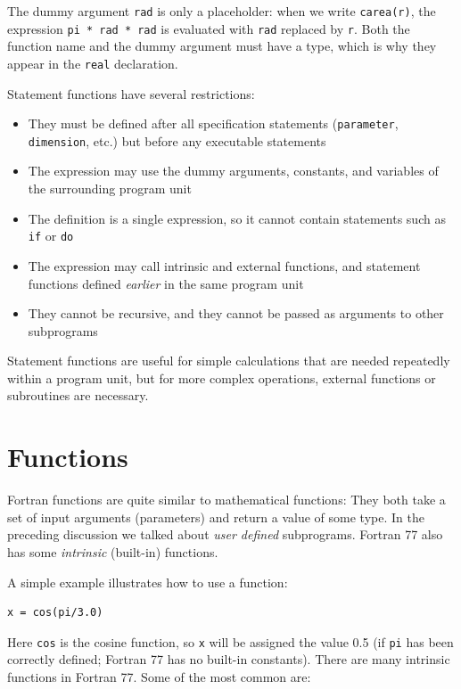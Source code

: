 The dummy argument \texttt{rad} is only a placeholder: when we write \texttt{carea(r)}, the expression \texttt{pi * rad * rad} is evaluated with \texttt{rad} replaced by \texttt{r}. Both the function name and the dummy argument must have a type, which is why they appear in the \texttt{real} declaration.

Statement functions have several restrictions:

\begin{itemize}
    \item They must be defined after all specification statements (\texttt{parameter}, \texttt{dimension}, etc.) but before any executable statements
    \item The expression may use the dummy arguments, constants, and variables of the surrounding program unit
    \item The definition is a single expression, so it cannot contain statements such as \texttt{if} or \texttt{do}
    \item The expression may call intrinsic and external functions, and statement functions defined \emph{earlier} in the same program unit
    \item They cannot be recursive, and they cannot be passed as arguments to other subprograms
\end{itemize}

Statement functions are useful for simple calculations that are needed repeatedly within a program unit, but for more complex operations, external functions or subroutines are necessary.

\section{Functions}

Fortran functions are quite similar to mathematical functions: They both take a set of input arguments (parameters) and return a value of some type. In the preceding discussion we talked about \emph{user defined} subprograms. Fortran 77 also has some \emph{intrinsic} (built-in) functions.

A simple example illustrates how to use a function:

\begin{lstlisting}[style=fortran77]
      x = cos(pi/3.0)
\end{lstlisting}

Here \texttt{cos} is the cosine function, so \texttt{x} will be assigned the value 0.5 (if \texttt{pi} has been correctly defined; Fortran 77 has no built-in constants). There are many intrinsic functions in Fortran 77. Some of the most common are:

